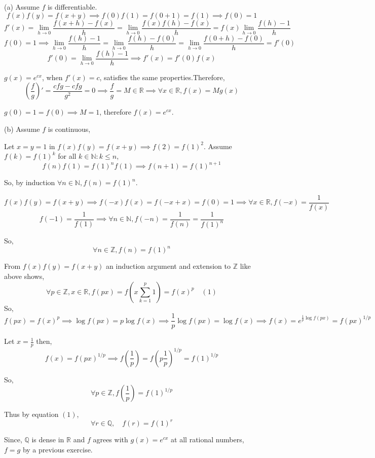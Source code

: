 \documentclass{article}
\newcommand\N{\mathbb{N}}
\newcommand\Z{\mathbb{Z}}
\newcommand\Q{\mathbb{Q}}
\newcommand\R{\mathbb{R}}
\begin{document}
(a) Assume $f$ is differentiable.
\[f(x)f(y) = f(x+y) \implies f(0)f(1) = f(0+1) = f(1) \implies f(0) =
  1\]
\[f'(x) = \lim_{h\rightarrow 0} \frac{f(x+h) - f(x)}{h} =
  \lim_{h\rightarrow 0} \frac{f(x)f(h) - f(x)}{h}  = f(x) \lim_{h\rightarrow 0} \frac{f(h) - 1}{h}\]
\[f(0) = 1 \implies \lim_{h\rightarrow 0} \frac{f(h) - 1}{h} =
  \lim_{h\rightarrow 0} \frac{f(h) - f(0)}{h} = \lim_{h\rightarrow 0}
  \frac{f(0+h) - f(0)}{h} = f'(0)\]
\[f'(0) = \lim_{h\rightarrow 0} \frac{f(h) - 1}{h} \implies f'(x) =
  f'(0)f(x)\]

$g(x) = e^{cx}$, when $f'(x) = c$, satisfies the same
properties.Therefore,
\[\left(\frac{f}{g}\right)' = \frac{cfg -cfg}{g^2} = 0 \implies
  \frac{f}{g} = M \in \R \implies \forall x\in \R,  f(x) = M g(x)\]

$g(0) = 1 = f(0) \implies M = 1$, therefore $f(x)= e^{cx}.$

(b) Assume $f$ is continuous,

Let  $x= y = 1$ in $f(x)f(y) = f(x+y) \implies f(2) = f(1)^2$.
Assume $f(k) = f(1)^k$ for all $k \in \N: k\leq n$,
\[f(n)f(1) = f(1)^nf(1)  \implies f(n+1) = f(1)^{n+1}\]

So, by induction $\forall n\in \N, f(n)=f(1)^n$.

\[f(x)f(y) = f(x+y) \implies f(-x)f(x) = f(-x+x) = f(0) = 1 \implies
  \forall x \in \R, f(-x) = \frac{1}{f(x)}\]
\[ f(-1) = \frac{1}{f(1)} \implies  \forall n\in\N, f(-n) =\frac{1}{f(n)} =
  \frac{1}{f(1)^n}\]

So, \[\forall n\in \Z, f(n) = f(1)^n\]

From $f(x)f(y) = f(x+y)$ an induction argument and extension to $\Z$ like above shows, \[
  \forall p\in \Z, x\in \R, f\left(p x\right) =
  f\left(x\sum_{k=1}^{p} 1\right) = f\left(x
  \right)^p \quad (1)\]
So,
\[f(px) = f(x)^p \implies \log f(px) = p \log f(x) \implies
  \frac{1}{p} \log f(px) = \log f(x) \implies f(x) = e^{\frac{1}{p}
    \log f(px)} = f(px)^{1/p}\]

Let $x = \frac{1}{p}$ then, \[f(x) = f(px)^{1/p} \implies
  f\left(\frac{1}{p}\right) = f\left(p\frac{1}{p}\right)^{1/p} = f(1)^{1/p} \]

So, \[\forall p\in \Z, f\left(\frac{1}{p}\right) = f(1)^{1/p}\]

Thus by equation $(1)$,
\[\forall r \in \Q,\quad  f\left(r \right) = f(1)^{r}\]

Since, $\Q$ is dense in $\R$ and $f$ agrees with $g (x) = e^{cx}$ at all
rational numbers, $f = g$ by a previous exercise.
\end{document}
